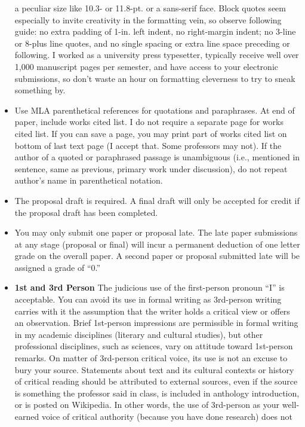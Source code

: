 \documentclass[]{article}
\begin{document}
\begin{itemize}
  a peculiar size like 10.3- or 11.8-pt. or a sans-serif face. Block
  quotes seem especially to invite creativity in the formatting vein, so
  observe following guide: no extra padding of 1-in. left indent, no
  right-margin indent; no 3-line or 8-plus line quotes, and no single
  spacing or extra line space preceding or following. I worked as a
  university press typesetter, typically receive well over 1,000
  manuscript pages per semester, and have access to your electronic
  submissions, so don't waste an hour on formatting cleverness to try to
  sneak something by.
\item
  Use MLA parenthetical references for quotations and paraphrases. At
  end of paper, include works cited list. I do not require a separate
  page for works cited list. If you can save a page, you may print part
  of works cited list on bottom of last text page (I accept that. Some
  professors may not). If the author of a quoted or paraphrased passage
  is unambiguous (i.e., mentioned in sentence, same as previous, primary
  work under discussion), do not repeat author's name in parenthetical
  notation.
\item
  The proposal draft is required. A final draft will only be accepted
  for credit if the proposal draft has been completed.
\item
  You may only submit one paper or proposal late. The late paper
  submissions at any stage (proposal or final) will incur a permanent
  deduction of one letter grade on the overall paper. A second paper or
  proposal submitted late will be assigned a grade of ``0.''
\item
  \textbf{1st and 3rd Person} The judicious use of the first-person
  pronoun ``I'' is acceptable. You can avoid its use in formal writing
  as 3rd-person writing carries with it the assumption that the writer
  holds a critical view or offers an observation. Brief 1st-person
  impressions are permissible in formal writing in my academic
  disciplines (literary and cultural studies), but other professional
  disciplines, such as sciences, vary on attitude toward 1st-person
  remarks. On matter of 3rd-person critical voice, its use is not an
  excuse to bury your source. Statements about text and its cultural
  contexts or history of critical reading should be attributed to
  external sources, even if the source is something the professor said
  in class, is included in anthology introduction, or is posted on
  Wikipedia. In other words, the use of 3rd-person as your well-earned
  voice of critical authority (because you have done research) does not

\end{itemize}
\end{document}
